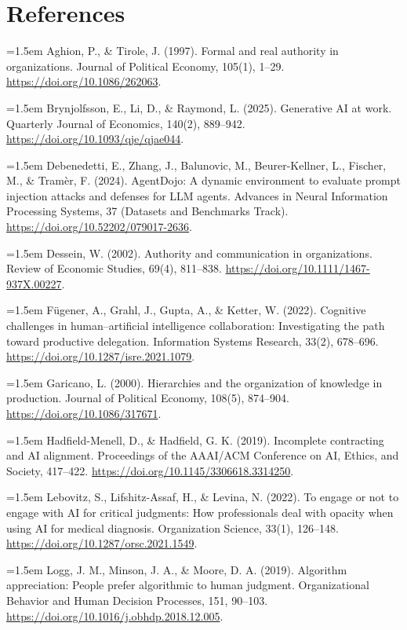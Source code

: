 \documentclass[11pt,letterpaper]{article}
\begin{document}
\section*{References}
\par\noindent\hangindent=1.5em Aghion, P., \& Tirole, J. (1997). Formal and real authority in organizations. Journal of Political Economy, 105(1), 1--29. \url{https://doi.org/10.1086/262063}.
\par\noindent\hangindent=1.5em Brynjolfsson, E., Li, D., \& Raymond, L. (2025). Generative AI at work. Quarterly Journal of Economics, 140(2), 889--942. \url{https://doi.org/10.1093/qje/qjae044}.
\par\noindent\hangindent=1.5em Debenedetti, E., Zhang, J., Balunovic, M., Beurer-Kellner, L., Fischer, M., \& Tramèr, F. (2024). AgentDojo: A dynamic environment to evaluate prompt injection attacks and defenses for LLM agents. Advances in Neural Information Processing Systems, 37 (Datasets and Benchmarks Track). \url{https://doi.org/10.52202/079017-2636}.
\par\noindent\hangindent=1.5em Dessein, W. (2002). Authority and communication in organizations. Review of Economic Studies, 69(4), 811--838. \url{https://doi.org/10.1111/1467-937X.00227}.
\par\noindent\hangindent=1.5em Fügener, A., Grahl, J., Gupta, A., \& Ketter, W. (2022). Cognitive challenges in human--artificial intelligence collaboration: Investigating the path toward productive delegation. Information Systems Research, 33(2), 678--696. \url{https://doi.org/10.1287/isre.2021.1079}.
\par\noindent\hangindent=1.5em Garicano, L. (2000). Hierarchies and the organization of knowledge in production. Journal of Political Economy, 108(5), 874--904. \url{https://doi.org/10.1086/317671}.
\par\noindent\hangindent=1.5em Hadfield-Menell, D., \& Hadfield, G. K. (2019). Incomplete contracting and AI alignment. Proceedings of the AAAI/ACM Conference on AI, Ethics, and Society, 417--422. \url{https://doi.org/10.1145/3306618.3314250}.
\par\noindent\hangindent=1.5em Lebovitz, S., Lifshitz-Assaf, H., \& Levina, N. (2022). To engage or not to engage with AI for critical judgments: How professionals deal with opacity when using AI for medical diagnosis. Organization Science, 33(1), 126--148. \url{https://doi.org/10.1287/orsc.2021.1549}.
\par\noindent\hangindent=1.5em Logg, J. M., Minson, J. A., \& Moore, D. A. (2019). Algorithm appreciation: People prefer algorithmic to human judgment. Organizational Behavior and Human Decision Processes, 151, 90--103. \url{https://doi.org/10.1016/j.obhdp.2018.12.005}.
\end{document}
